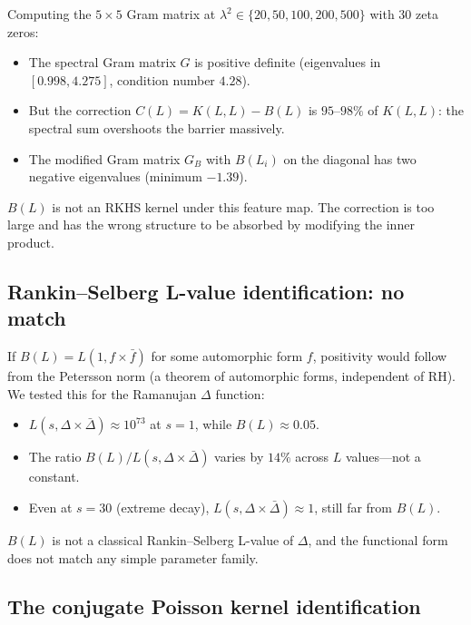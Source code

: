 \documentclass[11pt,a4paper]{article}
\begin{document}
Computing the $5 \times 5$ Gram matrix at $\lambda^2 \in \{20, 50, 100, 200, 500\}$ with 30 zeta zeros:
\begin{itemize}
\item The spectral Gram matrix $G$ is positive definite (eigenvalues in $[0.998, 4.275]$, condition number $4.28$).
\item But the correction $C(L) = K(L,L) - B(L)$ is $95\text{--}98\%$ of $K(L,L)$: the spectral sum overshoots the barrier massively.
\item The modified Gram matrix $G_B$ with $B(L_i)$ on the diagonal has two negative eigenvalues (minimum $-1.39$).
\end{itemize}

$B(L)$ is not an RKHS kernel under this feature map. The correction is too large and has the wrong structure to be absorbed by modifying the inner product.

\subsection{Rankin--Selberg L-value identification: no match}

If $B(L) = L(1, f \times \bar{f})$ for some automorphic form $f$, positivity would follow from the Petersson norm (a theorem of automorphic forms, independent of RH). We tested this for the Ramanujan $\Delta$ function:
\begin{itemize}
\item $L(s, \Delta \times \bar\Delta) \approx 10^{73}$ at $s = 1$, while $B(L) \approx 0.05$.
\item The ratio $B(L) / L(s, \Delta \times \bar\Delta)$ varies by $14\%$ across $L$ values---not a constant.
\item Even at $s = 30$ (extreme decay), $L(s, \Delta \times \bar\Delta) \approx 1$, still far from $B(L)$.
\end{itemize}

$B(L)$ is not a classical Rankin--Selberg L-value of $\Delta$, and the functional form does not match any simple parameter family.

\subsection{The conjugate Poisson kernel identification}\label{subsec:conj-poisson}
\end{document}
